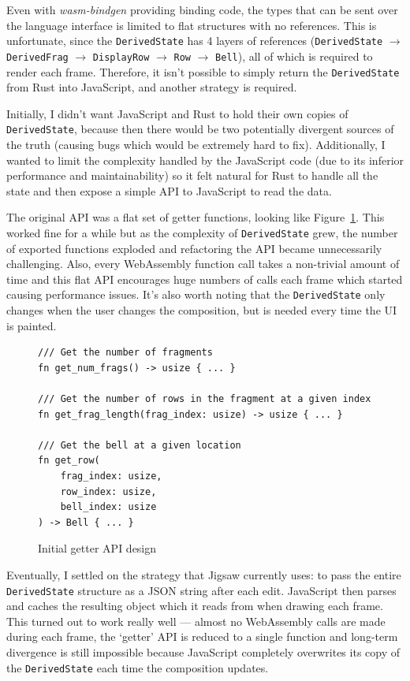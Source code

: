 \documentclass[12pt]{article}
\begin{document}
Even with \emph{wasm-bindgen} providing binding code, the types that can be sent over the language
interface is limited to flat structures with no references.  This is unfortunate, since the
\verb|DerivedState| has 4 layers of references (\verb|DerivedState| $\to$ \verb|DerivedFrag| $\to$
\verb|DisplayRow| $\to$ \verb|Row| $\to$ \verb|Bell|), all of which is required to render each
frame.  Therefore, it isn't possible to simply return the \verb|DerivedState| from Rust into
JavaScript, and another strategy is required.

Initially, I didn't want JavaScript and Rust to hold their own copies of \verb|DerivedState|,
because then there would be two potentially divergent sources of the truth (causing bugs which would
be extremely hard to fix).  Additionally, I wanted to limit the complexity handled by the JavaScript
code (due to its inferior performance and maintainability) so it felt natural for Rust to handle all
the state and then expose a simple API to JavaScript to read the data.

The original API was a flat set of getter functions, looking like Figure~\ref{fig:initial-api}.
This worked fine for a while but as the complexity of \verb|DerivedState| grew, the number of
exported functions exploded and refactoring the API became unnecessarily challenging.  Also, every
WebAssembly function call takes a non-trivial amount of time and this flat API encourages huge
numbers of calls each frame which started causing performance issues.  It's also worth noting that
the \verb|DerivedState| only changes when the user changes the composition, but is needed every time
the UI is painted.

\begin{figure}
    \begin{verbatim}
/// Get the number of fragments
fn get_num_frags() -> usize { ... }

/// Get the number of rows in the fragment at a given index
fn get_frag_length(frag_index: usize) -> usize { ... }

/// Get the bell at a given location
fn get_row(
    frag_index: usize,
    row_index: usize,
    bell_index: usize
) -> Bell { ... }
    \end{verbatim}
    \caption{Initial getter API design}\label{fig:initial-api}
\end{figure}

Eventually, I settled on the strategy that Jigsaw currently uses:  to pass the entire
\verb|DerivedState| structure as a JSON string
after each edit.  JavaScript then parses and caches the resulting object which it reads from when
drawing each frame.  This turned out to work really well --- almost no WebAssembly calls are made
during each frame, the `getter' API is reduced to a single function and long-term divergence is
still impossible because JavaScript completely overwrites its copy of the \verb|DerivedState| each
time the composition updates.
\end{document}
